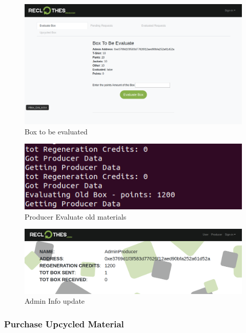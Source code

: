 \begin{figure}[h!]
	\centering
    \includegraphics[totalheight=7cm]{img/test/usecase2/1-box-tobe-evaluate.png}
	\caption{Box to be evaluated}
	\label{fig:box-tobe-evaluate}
\end{figure}

\begin{figure}[h!]
	\centering
    \includegraphics[totalheight=4cm]{img/test/usecase2/2-evaluation.png}
	\caption{Producer Evaluate old materials}
	\label{fig:evaluation-old-clothes}
\end{figure}

\begin{figure}[h!]
	\centering
    \includegraphics[totalheight=4cm]{img/test/usecase2/3-credits-received.png}
	\caption{Admin Info update}
	\label{fig:credits-received}
\end{figure}

\subsubsection{Purchase Upcycled Material}
 
